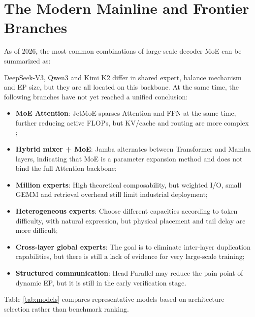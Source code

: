 \documentclass[10pt,a4paper,fontset=none]{ctexart}
\newcommand{\term}[1]{\textbf{#1}}
\begin{document}
\section{The Modern Mainline and Frontier Branches}

As of 2026, the most common combinations of large-scale decoder MoE can be summarized as:
\begin{center}
\end{center}

DeepSeek-V3, Qwen3 and Kimi K2 differ in shared expert, balance mechanism and EP size, but they are all located on this backbone. At the same time, the following branches have not yet reached a unified conclusion:
\begin{itemize}
\item \term{MoE Attention}: JetMoE sparses Attention and FFN at the same time, further reducing active FLOPs, but KV/cache and routing are more complex \cite{shen2024jetmoe};
\item \term{Hybrid mixer + MoE}: Jamba alternates between Transformer and Mamba layers, indicating that MoE is a parameter expansion method and does not bind the full Attention backbone\cite{lieber2024jamba};
\item \term{Million experts}: High theoretical composability, but weighted I/O, small GEMM and retrieval overhead still limit industrial deployment;
\item \term{Heterogeneous experts}: Choose different capacities according to token difficulty, with natural expression, but physical placement and tail delay are more difficult;
\item \term{Cross-layer global experts}: The goal is to eliminate inter-layer duplication capabilities, but there is still a lack of evidence for very large-scale training;
\item \term{Structured communication}: Head Parallel may reduce the pain point of dynamic EP, but it is still in the early verification stage.
\end{itemize}

Table \ref{tab:models} compares representative models based on architecture selection rather than benchmark ranking.
\end{document}
